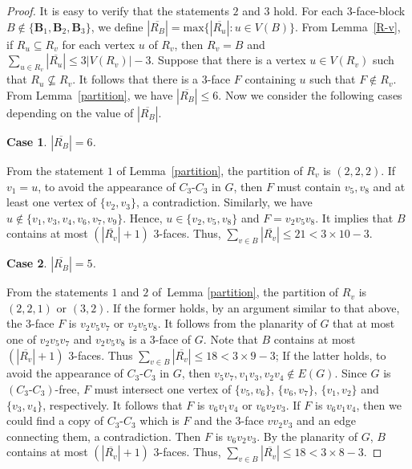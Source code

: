 \documentclass[12pt]{article}
\newtheorem{case}{Case}[section]
\begin{document}
\begin{proof}
    It is easy to verify that the statements $2$ and $3$ hold. For each $3$-face-block $B\notin\{\mathbf{B}_1,\mathbf{B}_2,\mathbf{B}_3\}$, we define $|\overline{R_B}|=\mbox{max}\{|\overline{R_u}|:u\in V(B)\}$. From Lemma~\ref{R-v}, if $R_u\subseteq R_v$ for each vertex $u$ of $R_v$, then $R_v=B$ and $\sum_{u \in R_v}|\overline{R_u}| \leq 3|V(R_v)|-3$. 
    Suppose that there is a vertex $u\in V(R_v)$ such that $R_u\not\subseteq R_v$. It follows that there is a $3$-face $F$ containing $u$ such that $F\notin R_v$. From Lemma~\ref{partition}, we have $|\overline{R_B}|\leq 6$. Now we consider the following cases depending on the value of $|\overline{R_B}|$.

    \begin{case} 
        $|\overline{R_B}|=6$.
    \end{case}
    
    From the statement $1$ of Lemma~\ref{partition}, the partition of $R_v$ is $(2,2,2)$. If $v_1=u$, to avoid the appearance of $C_3\textbf{-}C_3$ in $G$, then $F$ must contain $v_5, v_8$ and at least one vertex of $\{v_2,v_3\}$, a contradiction. Similarly, we have $u\notin\{v_1,v_3,v_4,v_6,v_7,v_9\}$. Hence, $u\in\{v_2,v_5,v_8\}$ and $F=v_2v_5v_8$. It implies that $B$ contains at most $(|\overline{R_v}|+1)$ $3$-faces. Thus, $\sum_{v\in B}|\overline{R_v}| \leq 21 < 3\times10-3$. 
    
    \begin{case} 
        $|\overline{R_B}|=5$.
    \end{case}
    
    From the statements $1$ and $2$ of~Lemma \ref{partition}, the partition of $R_v$ is $(2,2,1)$ or $(3,2)$.
    If the former holds, by an argument similar to that above, the $3$-face $F$ is $v_2v_5v_7$ or $v_2v_5v_8$. It follows from the planarity of $G$ that at most one of $v_2v_5v_7$ and $v_2v_5v_8$ is a $3$-face of $G$. Note that $B$ contains at most $(|\overline{R_v}|+1)$ $3$-faces. Thus $\sum_{v \in B}|\overline{R_v}| \leq 18 < 3\times9-3$; 
    If the latter holds, to avoid the appearance of $C_3\textbf{-}C_3$ in $G$, then $v_5v_7, v_1v_3, v_2v_4 \notin E(G)$. Since $G$ is $(C_3\textbf{-}C_3)$-free, $F$ must intersect one vertex of $\{v_5,v_6\}$, $\{v_6,v_7\}$, $\{v_1,v_2\}$ and $\{v_3,v_4\}$, respectively. It follows that $F$ is $v_6v_1v_4$ or $v_6v_2v_3$. If $F$ is $v_6v_1v_4$, then we could find a copy of $C_3\textbf{-}C_3$ which is $F$ and the $3$-face $vv_2v_3$ and an edge connecting them, a contradiction. Then $F$ is $v_6v_2v_3$. By the planarity of $G$, $B$ contains at most $(|\overline{R_v}|+1)$ $3$-faces. Thus, $\sum_{v \in B}|\overline{R_v}| \leq 18 < 3\times8-3$.


\end{proof}
\end{document}
